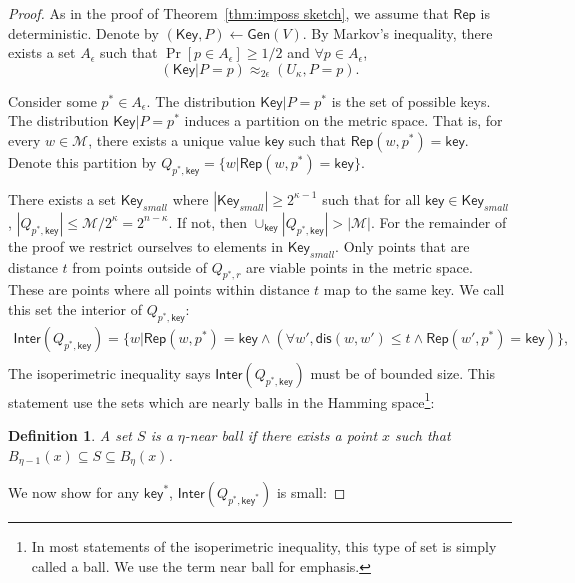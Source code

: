\documentclass[11pt]{article}
\newcommand{\thref}[1]{\mbox{Theorem~\ref{#1}}}
\newcommand{\class}[1]{{\ensuremath{\mathsf{#1}}}}
\newcommand{\key}{\ensuremath{\class{key}}\xspace}
\newcommand{\Key}{\ensuremath{\class{Key}}\xspace}
\newcommand{\gen}{\ensuremath{\class{Gen}}\xspace}
\newcommand{\rep}{\ensuremath{\class{Rep}}\xspace}
\newcommand{\rec}{\ensuremath{\class{Rec}}\xspace}
\newcommand{\crust}{\ensuremath{\class{Crust}}\xspace}
\newcommand{\inter}{\ensuremath{\class{Inter}}\xspace}
\newcommand{\dis}{\ensuremath{\mathsf{dis}}}
\newtheorem{definition}[theorem]{Definition}
\begin{document}
\begin{proof}
As in the proof of \thref{thm:imposs sketch}, we assume that $\rep$ is deterministic.  Denote by $(\Key, P) \leftarrow \gen(V)$.
By Markov's inequality, there exists a set $A_{\epsilon}$ such that $\Pr[p\in A_{\epsilon}]\ge 1/2$ and $\forall p\in A_{\epsilon}$, 
\[
(\Key |P =p) \approx_{2\epsilon} (U_\kappa , P =p).
\]

Consider some $p^*\in A_{\epsilon}$.  
The distribution $\Key|P=p^*$ is the set of possible keys.
The distribution $\Key|P=p^*$ induces a partition on the metric space.  That is, for every $w\in\mathcal{M}$, there exists a unique value $\key$ such that $\rep(w, p^*) =\key$.  Denote this partition by $Q_{p^*,\key} = \{w | \rep(w, p^*) = \key\}$.  

There exists a set $\Key_{small}$  where $|\Key_{small} | \ge 2^{\kappa-1}$ such that for all $\key\in \Key_{small}$,  $|Q_{p^*, \key}|\le \mathcal{M}/2^{\kappa} = 2^{n-\kappa }$.  If not, then $\cup_{\key} |Q_{p^*, \key}| > |\mathcal{M}|$.
For the remainder of the proof we restrict ourselves to elements in $\Key_{small}$.  Only points that are distance $t$ from points outside of $Q_{p^*, r}$ are viable points in the metric space.  These are points where all points within distance $t$ map to the same key.  We call this set the interior of $Q_{p^*, \key}$: 
\begin{align*}
\inter(Q_{p^*, \key}) = \{w | \rep(w, p^*) = \key \wedge (\forall w', \dis(w, w') \le t \wedge \rep(w', p^*) =\key)\},\\
\end{align*}
 The isoperimetric inequality says $\inter(Q_{p^*, \key})$ must be of bounded size.  This statement use the sets which are nearly balls in the Hamming space\footnote{In most statements of the isoperimetric inequality, this type of set is simply called a ball.  We use the term near ball for emphasis.}:
\begin{definition}
A set $S$ is a $\eta$-near ball if there exists a point $x$ such that $B_{\eta-1}(x) \subseteq S \subseteq B_{\eta}(x)$.
\end{definition}
\noindent
We now show for any $\key^*$, $\inter(Q_{p^*, \key^*})$ is small:


\end{proof}
\end{document}

